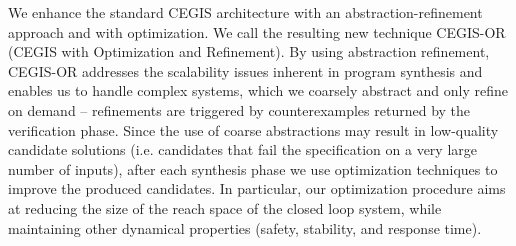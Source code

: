 \documentclass[a4paper,UKenglish]{lipics-v2018}
\begin{document}
We enhance the standard CEGIS architecture with an abstraction-refinement
approach and with optimization.  We call the resulting new technique
CEGIS-OR (CEGIS with Optimization and Refinement).  By using
abstraction refinement, CEGIS-OR addresses the scalability issues inherent
in program synthesis and enables us to handle complex systems, which we
coarsely abstract and only refine on demand -- refinements are triggered by
counterexamples returned by the verification phase.
%
%
Since the use of coarse abstractions may result in low-quality candidate
solutions (i.e.  candidates that fail the specification on a very large
number of inputs), after each synthesis phase we use optimization techniques
to improve the produced candidates.  In particular, our optimization
procedure aims at reducing the size of the reach space of the closed loop
system, while maintaining other dynamical properties (safety, stability, and
response time).

\end{document}
